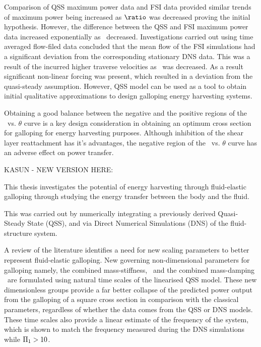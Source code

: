 Comparison of QSS maximum power data and FSI data provided similar trends of maximum power being increased as $\ratio$ was decreased proving the initial hypothesis. However, the difference between the QSS and FSI maximum power data increased exponentially as \ratio\ decreased. Investigations carried out using time averaged flow-filed data concluded that the mean flow of the FSI simulations had a significant deviation from the corresponding stationary DNS data. This was a result of the incurred higher  traverse velocities as \ratio\ was decreased. As a result significant non-linear forcing was present, which resulted in a deviation from the quasi-steady assumption. However, QSS model can be used as a tool to obtain initial qualitative approximations to design galloping energy harvesting systems. 

Obtaining a good balance between the negative and the positive regions of the \cy\ vs. $\theta$ curve is a key design consideration in obtaining an optimum cross section for galloping for energy harvesting purposes. Although inhibition of the shear layer reattachment has it's advantages, the negative region of the \cy\ vs. $\theta$ curve has an adverse effect on power transfer. 


KASUN - NEW VERSION HERE:

This thesis investigates the potential of energy harvesting through fluid-elastic galloping through studying the energy transfer between the body and the fluid.

This was carried out by numerically integrating a previously derived Quasi-Steady State (QSS), and via Direct Numerical Simulations (DNS) of the fluid-structure system.

A review of the literature identifies a need for new scaling parameters to better represent fluid-elastic galloping. New governing non-dimensional parameters for galloping namely, the combined mass-stiffness, \massstiff\, and the combined mass-damping \massdamp\ are formulated using natural time scales of the linearised QSS model. These new dimensionless groups provide a far better collapse of the predicted power output from the galloping of a square cross section in comparison with the classical parameters, regardless of whether the data comes from the QSS or DNS models. These time scales also provide a linear estimate of the frequency of the system, which is shown to match the frequency measured during the DNS simulations while $\Pi_1 > 10$.

